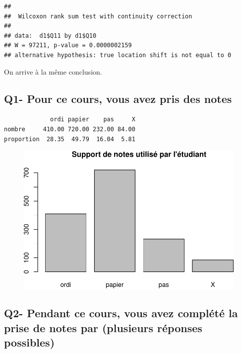 \documentclass[]{article}
\newenvironment{Shaded}{\begin{snugshade}}{\end{snugshade}}
\newcommand{\KeywordTok}[1]{\textcolor[rgb]{0.13,0.29,0.53}{\textbf{{#1}}}}
\newcommand{\StringTok}[1]{\textcolor[rgb]{0.31,0.60,0.02}{{#1}}}
\newcommand{\NormalTok}[1]{{#1}}
\begin{document}
\begin{Shaded}
\end{Shaded}

\begin{verbatim}
## 
##  Wilcoxon rank sum test with continuity correction
## 
## data:  d1$Q11 by d1$Q10
## W = 97211, p-value = 0.0000002159
## alternative hypothesis: true location shift is not equal to 0
\end{verbatim}

On arrive à la même conclusion.

\subsection{Q1- Pour ce cours, vous avez pris des
notes}\label{q1--pour-ce-cours-vous-avez-pris-des-notes}

\begin{verbatim}
             ordi papier    pas     X
nombre     410.00 720.00 232.00 84.00
proportion  28.35  49.79  16.04  5.81
\end{verbatim}

\begin{figure}[htbp]
\centering
\includegraphics{qs_etudiants_files/figure-latex/Q1-1.pdf}
\end{figure}

\subsection{Q2- Pendant ce cours, vous avez complété la prise de notes
par (plusieurs réponses
possibles)}\label{q2--pendant-ce-cours-vous-avez-complete-la-prise-de-notes-par-plusieurs-reponses-possibles}
\end{document}
